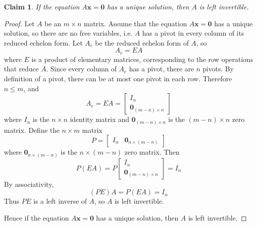 \documentclass{article}
\newtheorem*{claim}{Claim}
\begin{document}
\begin{claim}
    If the equation $A\mathbf{x} = \mathbf{0}$ has a unique solution, then $A$ is left invertible.
\end{claim}

\begin{proof}
    Let $A$ be an $m \times n$ matrix. Assume that the equation $A\mathbf{x} = \mathbf{0}$ has a unique 
    solution, so there are no free variables, i.e. $A$ has a pivot in every column of its reduced echelon form. 
    Let $A_e$ be the reduced echelon form of $A$, so 
    \[
    A_e = EA
    \]
    where $E$ is a product of elementary matrices, corresponding to the row operations that reduce $A$. Since 
    every column of $A_e$ has a pivot, there are $n$ pivots. By definition of a pivot, there can be at most 
    one pivot in each row. Therefore $n \leq m$, and 
    \[
    A_e = EA = 
    \begin{bmatrix}
        I_n \\ \mathbf{0}_{(m-n) \times n}
    \end{bmatrix}
    \]
    where $I_n$ is the $n \times n$ identity matrix and $\mathbf{0}_{(m-n) \times n}$ is the $(m-n) \times n$ 
    zero matrix. Define the $n \times m$ matrix 
    \[
    P = 
    \begin{bmatrix}
        I_n & \mathbf{0}_{n \times (m-n)}
    \end{bmatrix}
    \]
    where $\mathbf{0}_{n \times (m-n)}$ is the $n \times (m-n)$ zero matrix. Then
    \[
    P(EA) = P\begin{bmatrix} I_n \\ \mathbf{0}_{(m-n) \times n} \end{bmatrix} = I_n
    \]
    By associativity, 
    \[
    (PE)A = P(EA) = I_n
    \]
    Thus $PE$ is a left inverse of $A$, so $A$ is left invertible.

    \medskip

    Hence if the equation $A\mathbf{x} = \mathbf{0}$ has a unique solution, then $A$ is left invertible.
\end{proof}
\end{document}
